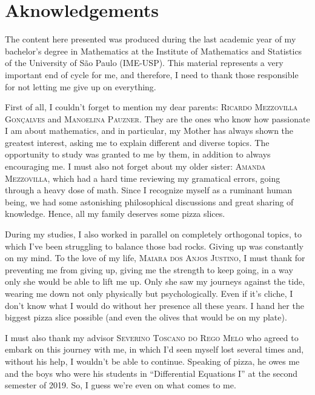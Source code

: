 \thispagestyle{empty}
\chapter*{Aknowledgements}

The content here presented was produced during the last academic year of my bachelor's degree in Mathematics at the Institute of Mathematics and Statistics of the University of São Paulo (IME-USP). This material represents a very important end of cycle for me, and therefore, I need to thank those responsible for not letting me give up on everything.

First of all, I couldn't forget to mention my dear parents: \textsc{Ricardo Mezzovilla Gonçalves} and \textsc{Manoelina Pauzner}. They are the ones who know how passionate I am about mathematics, and in particular, my Mother has always shown the greatest interest, asking me to explain different and diverse topics. The opportunity to study was granted to me by them, in addition to always encouraging me. I must also not forget about my older sister: \textsc{Amanda Mezzovilla}, which had a hard time reviewing my gramatical errors, going through a heavy dose of math. Since I recognize myself as a ruminant human being, we had some astonishing philosophical discussions and great sharing of knowledge. Hence, all my family deserves some pizza slices.

During my studies, I also worked in parallel on completely orthogonal topics, to which I've been struggling to balance those bad rocks. Giving up was constantly on my mind. To the love of my life, \textsc{Maiara dos Anjos Justino}, I must thank for preventing me from giving up, giving me the strength to keep going, in a way only she would be able to lift me up. Only she saw my journeys against the tide, wearing me down not only physically but psychologically. Even if it's cliche, I don't know what I would do without her presence all these years. I hand her the biggest pizza slice possible (and even the olives that would be on my plate).

I must also thank my advisor \textsc{Severino Toscano do Rego Melo} who agreed to embark on this journey with me, in which I'd seen myself lost several times and, without his help, I wouldn't be able to continue. Speaking of pizza, he owes me and the boys who were his students in ``Differential Equations I'' at the second semester of 2019. So, I guess we're even on what comes to me.

